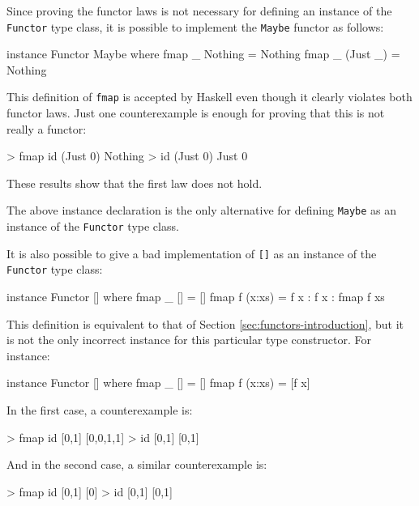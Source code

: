 \begin{example}
  \label{ex:functors-haskell-bad-maybe}
  Since proving the functor laws is not necessary for defining an
  instance of the \texttt{Functor} type class, it is possible to
  implement the \texttt{Maybe} functor as follows:
  \begin{codehaskell}
    instance Functor Maybe where
      fmap _ Nothing  = Nothing
      fmap _ (Just _) = Nothing
  \end{codehaskell}

  This definition of \texttt{fmap} is accepted by Haskell even though
  it clearly violates both functor laws. Just one counterexample is
  enough for proving that this is not really a functor:
  \begin{codehaskell}
    > fmap id (Just 0)
    Nothing
    > id (Just 0)
    Just 0
  \end{codehaskell}
  These results show that the first law does not hold.

  The above instance declaration is the only alternative for defining
  \texttt{Maybe} as an instance of the \texttt{Functor} type class.
\end{example}


\begin{example}[\texttt{[]}]
  It is also possible to give a bad implementation of \texttt{[]} as
  an instance of the \texttt{Functor} type class:
  \begin{codehaskell}
    instance Functor [] where
      fmap _ []     = []
      fmap f (x:xs) = f x : f x : fmap f xs
  \end{codehaskell}
  This definition is equivalent to that of Section
  \ref{sec:functors-introduction}, but it is not the only incorrect
  instance for this particular type constructor. For instance:
  \begin{codehaskell}
    instance Functor [] where
      fmap _ []     = []
      fmap f (x:xs) = [f x]
  \end{codehaskell}

  In the first case, a counterexample is:
  \begin{codehaskell}
    > fmap id [0,1]
    [0,0,1,1]
    > id [0,1]
    [0,1]
  \end{codehaskell}

  And in the second case, a similar counterexample is:
  \begin{codehaskell}
    > fmap id [0,1]
    [0]
    > id [0,1]
    [0,1]
  \end{codehaskell}
\end{example}

